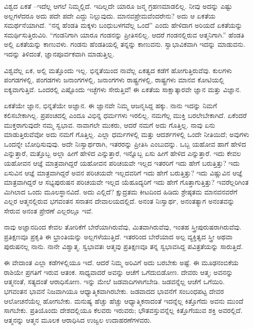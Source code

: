 ವಿಶ್ವದ ಏಕತೆ –ಇದೆಲ್ಲ ಆಗಲೆ ನಿಮ್ಮಲ್ಲಿದೆ. ಇದಿಲ್ಲದೇ ಯಾರೂ ಜನ್ಮ ಗ್ರಹಣಮಾಡಲಿಲ್ಲ. ನೀವು ಅದನ್ನು ಎಷ್ಟು ಅಲ್ಲಗಳೆದರೂ ಅದು ಪದೇ ಪದೇ ಎದ್ದು ನಿಲ್ಲುವುದು. ಮಾನವಪ್ರೇಮವೆಂದರೇನು? ಅದು ಆ ಏಕತೆಯ ಸಮರ್ಥನೆಯಾಗಿದೆ. “ನನ್ನ ಹೆಂಡತಿ ಮಕ್ಕಳು ಬಂಧುಬಳಗವೆಲ್ಲ ಒಂದೆ'' ಎಂದು ಹೇಳಿದಾಗ ಅರಿಯದೆ ಏಕತೆಯನ್ನು ಸಮರ್ಥಿಸುತ್ತಿರುವಿರಿ. “ಗಂಡನಿಗಾಗಿ ಯಾರೂ ಗಂಡನನ್ನು ಪ್ರೀತಿಸಲಿಲ್ಲ. ಆದರೆ ಗಂಡನಲ್ಲಿರುವ ಆತ್ಮನಿಗಾಗಿ.” ಹೆಂಡತಿ ಅಲ್ಲಿ ಏಕತೆಯನ್ನು ಕಾಣುವಳು. ಗಂಡನು ಹೆಂಡತಿಯಲ್ಲಿ ತನ್ನನ್ನು ಕಾಣುವನು. ಸ್ವಾಭಾವಿಕವಾಗಿ ಇದನ್ನು ಮಾಡುವನು. ಇದನ್ನು ತಿಳಿದಂತೆ, ಜ್ಞಾನಪೂರ್ವಕವಾಗಿ ಮಾಡುತ್ತಿಲ್ಲ.

ವಿಶ್ವವೆಲ್ಲ ಏಕ, ಅಲ್ಲಿ ಮತ್ತೊಂದು ಇಲ್ಲ. ಭಿನ್ನತೆಯಿಂದ ನಾವೆಲ್ಲ ಏಕತ್ವದ ಕಡೆಗೆ ಹೋಗುತ್ತಿರುವೆವು. ಕುಲಗಳು ಪಂಗಡಗಳಲ್ಲಿ, ಪಂಗಡಗಳು ಜನಾಂಗಗಳಲ್ಲಿ, ಜನಾಂಗಗಳು ರಾಷ್ಟ್ರಗಳಲ್ಲಿ, ರಾಷ್ಟ್ರಗಳು ಮಾನವ ಕೋಟಿಯಲ್ಲಿ ಐಕ್ಯವಾಗುತ್ತಿವೆ. ಒಂದರಲ್ಲಿ ಎಷ್ಟೊಂದು ಇಚ್ಛೆಗಳು ಸೇರುತ್ತಿವೆ! ಈ ಏಕತೆಯ ಸಾಕ್ಷಾತ್ಕಾರವೇ ಜ್ಞಾನ ಮತ್ತು ವಿಜ್ಞಾನ.

ಏಕತೆಯೇ ಜ್ಞಾನ, ಭಿನ್ನತೆಯೇ ಅಜ್ಞಾನ. ಈ ಜ್ಞಾನವೇ ನಿಮ್ಮ ಆಜನ್ಮಸಿದ್ದ ಹಕ್ಕು. ನಾನು ಇದನ್ನು ನಿಮಗೆ ಕಲಿಸಬೇಕಾಗಿಲ್ಲ. ಪ್ರಪಂಚದಲ್ಲಿ ಎಂದೂ ವಿಭಿನ್ನ ಧರ್ಮಗಳು ಇರಲಿಲ್ಲ. ನಮಗೆಲ್ಲ ಮುಕ್ತಿ ಬರಲೇಬೇಕಾಗಿದೆ. ಏಕೆಂದರೆ ಮುಕ್ತರಾಗುವುದೇ ನಮ್ಮ ಸ್ವಭಾವ. ನಾವಾಗಲೇ ಮುಕರು, ಆದರೆ ನಮಗೆ ಅದು ಗೊತ್ತಿಲ್ಲ. ನಾವು ಏನು ಮಾಡುತ್ತಿರುವೆವೋ ಅದು ನಮಗೆ ಗೊತ್ತಿಲ್ಲ. ಎಲ್ಲಾ ಧರ್ಮಗಳಲ್ಲಿ ಮತ್ತು ಆದರ್ಶಗಳಲ್ಲಿ ಒಂದೇ ನೀತಿಯಿದೆ; ಅವುಗಳು ಒಂದನ್ನೇ ಬೋಧಿಸುವುವು. ಅದೇ ನಿಃಸ್ವಾರ್ಥರಾಗಿ, ಇತರರನ್ನು ಪ್ರೀತಿಸಿ ಎಂಬುದನ್ನು. ಒಬ್ಬ ಯಹೋವ ಹಾಗೆ ಹೇಳಿದ ಎನ್ನುತ್ತಾರೆ, ಮತ್ತೊಬ್ಬ ಅಲ್ಲಾ ಹೀಗೆ ಹೇಳಿದ ಎನ್ನುತ್ತಾರೆ, ಇನ್ನೊಬ್ಬ ಏಸು ಹೀಗೆ ಹೇಳಿದ ಎನ್ನುತ್ತಾರೆ. ಇದು ಕೇವಲ ಯಹೋವನ ಆಜ್ಞೆ ಮಾತ್ರವಾಗಿದ್ದರೆ ಯಹೋವನ ಪರಿಚಯವೇ ಇಲ್ಲದ ಇತರರಿಗೆ ಇದು ಹೇಗೆ ಬರುತ್ತಿತ್ತು? ಇದು ಏಸುವಿನ ಆಜ್ಞೆ ಮಾತ್ರವಾಗಿದ್ದರೆ ಅವನ ಪರಿಚಯವೇ ಇಲ್ಲದವರಿಗೆ ಇದು ಹೇಗೆ ಬರುತ್ತಿತ್ತು? ಇದು ವಿಷ್ಣುವಿನ ಆಜ್ಞೆ ಮಾತ್ರವಾಗಿದ್ದರೆ ಆ ಸಭ್ಯಪುರುಷನ ಪರಿಚಯವೇ ಇಲ್ಲದ ಯೆಹೂದ್ಯರಿಗೆ ಇದು ಹೇಗೆ ಗೊತ್ತಾಗುತ್ತಿತ್ತು? ಇವರೆಲ್ಲರಿಗಿಂತ ಮಿಗಿಲಾದ ಒಂದು ಮೂಲಸ್ಥಾನವಿದೆ. ಅದು ಎಲ್ಲಿದೆ? ಕ್ಷುದ್ರತಮ ಕೀಟದಿಂದ ಹಿಡಿದು ಶ್ರೇಷ್ಠತಮ ಮಾನವನವರೆಗೆ ಎಲ್ಲರ ಆತ್ಮನಲ್ಲಿರುವ ಭಗವಂತನ ಸನಾತನ ದೇವಾಲಯದಲ್ಲಿದೆ. ಅನಂತ ನಿಃಸ್ವಾರ್ಥ, ಅನಂತತ್ಯಾಗ ಅನಂತವನ್ನು ಸೇರುವ ಅನಂತ ಪ್ರೇರಣೆ ಎಲ್ಲರಲ್ಲೂ ಇವೆ.

ನಾವು ಅಜ್ಞಾನದಿಂದ ಕೇವಲ ತೋರಿಕೆಗೆ ಬೇರೆಯಾಗಿರುವೆವು, ಮಿತವಾಗಿರುವೆವು, ಇಂತಹ ಸ್ತ್ರೀಪುರುಷರಾಗಿರುವೆವು. ಪ್ರತಿಕ್ಷಣವೂ ಪ್ರಕೃತಿ ಈ ಭ್ರಾಂತಿಯನ್ನು ಅಲ್ಲಗಳೆಯುತ್ತಿದೆ. ಇತರರಿಂದ ಬೇರೆಯಾದ ಅಲ್ಪ ವ್ಯಕ್ತಿತ್ವದ ಸ್ತ್ರೀ ಅಥವಾ ಪುರುಷನಲ್ಲ ನಾನು. ನಾನೇ ವಿಶ್ವಾತ್ಮ. ಸ್ವಭಾವತಃ ಆತ್ಮವು ಪ್ರತಿಕ್ಷಣವೂ ತನ್ನ ಸ್ವಭಾವಸಿದ್ದ ಪವಿತ್ರತೆಯನ್ನು ಸಾರುತ್ತಿದೆ.

ಈ ವೇದಾಂತ ಎಲ್ಲಾ ಕಡೆಗಳಲ್ಲಿಯೂ ಇದೆ. ಆದರೆ ನಿಮ್ಮ ಅರಿವಿಗೆ ಅದು ಬರಬೇಕು ಅಷ್ಟೆ. ಈ ಮೂಢನಂಬಿಕೆಯ ರಾಶಿಯೇ ಪ್ರಗತಿಗೆ ಇರುವ ಆತಂಕ. ಸಾಧ್ಯವಾದರೆ ಅವನ್ನು ಆಚೆಗೆ ಒಗೆದುಬಿಡೋಣ. ದೇವರು ಆತ್ಮ; ಅವನನ್ನು ಆತ್ಮನಂತೆ, ಸತ್ಯದಂತೆ ಆರಾಧಿಸೋಣ. ಇನ್ನು ಮೇಲೆ ಜಡವಾದಿಗಳಾಗಬೇಡಿ. ಜಡವನ್ನೆಲ್ಲ ಆಚೆಗೆ ಒಗೆಯಿರಿ. ಭಗವಂತನ ಭಾವನೆ ನಿಜವಾಗಿಯೂ ಆಧ್ಯಾತ್ಮಿಕವಾಗಿರಬೇಕು. ಜಡವಾದದ ಭಾವನೆಗೆ ಸಂಬಂಧಪಟ್ಟ ದೇವರ ಆಲೋಚನೆಯೆಲ್ಲ ಹೋಗಬೇಕು. ಮನುಷ್ಯ ಹೆಚ್ಚು ಹೆಚ್ಚು ಆಧ್ಯಾತ್ಮಿಕನಾದಂತೆ ಇದನ್ನೆಲ್ಲ ಕಿತ್ತೊಗೆದು ಅವನು ಮುಂದೆ ಸಾಗಬೇಕು. ಪ್ರತಿಯೊಂದು ದೇಶದಲ್ಲಿಯೂ ಕೆಲವರು ಇರುವರು; ಭೌತವಸ್ತುವನ್ನೆಲ್ಲ ಕಿತ್ತೊಗೆಯುವ ಶಕ್ತಿ ಅವರಲ್ಲಿದೆ. ಆತ್ಮನನ್ನು ಆತ್ಮನ ಮೂಲಕ ಆರಾಧಿಸಿದ ಉಜ್ವಲ ಉದಾಹರಣೆಗಳವರು.

